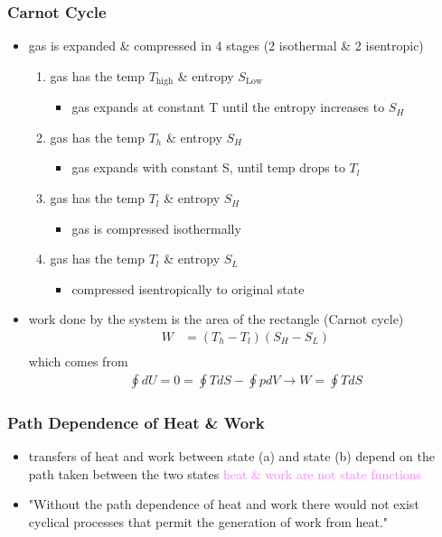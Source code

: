 \subsubsection{Carnot Cycle}
\begin{itemize}
	\item gas is expanded \& compressed in 4 stages (2 isothermal \& 2 isentropic)
	      \begin{enumerate}
		      \item gas has the temp $T_\text{high}$ \& entropy $S_\text{Low}$
		            \begin{itemize}
			            \item gas expands at constant T until the entropy increases to $S_H$
		            \end{itemize}
		      \item gas has the temp $T_h$ \& entropy $S_H$
		            \begin{itemize}
			            \item gas expands with constant S, until temp drops to $T_l$
		            \end{itemize}
		      \item gas has the temp $T_l$ \& entropy $S_H$
		            \begin{itemize}
			            \item gas is compressed isothermally
		            \end{itemize}
		      \item gas has the temp $T_l$ \& entropy $S_L$
		            \begin{itemize}
			            \item compressed isentropically to original state
		            \end{itemize}
	      \end{enumerate}
	\item work done by the system is the area of the rectangle (Carnot cycle)
	      \begin{align}
		      W & = (T_h - T_l) (S_H - S_L) \\
	      \end{align}
	      which comes from
	      \begin{align}
		      \oint dU = 0 = \oint TdS - \oint pdV \rightarrow W = \oint TdS
	      \end{align}
\end{itemize}


\subsubsection{Path Dependence of Heat \& Work}
\begin{itemize}
	\item transfers of heat and work between state (a) and state (b) depend on the path
	      taken between the two states \textcolor{violet}{heat \& work are not state functions}
	\item "Without the path dependence of heat and work there would not exist cyclical
	      processes that permit the generation of work from heat."
\end{itemize}

